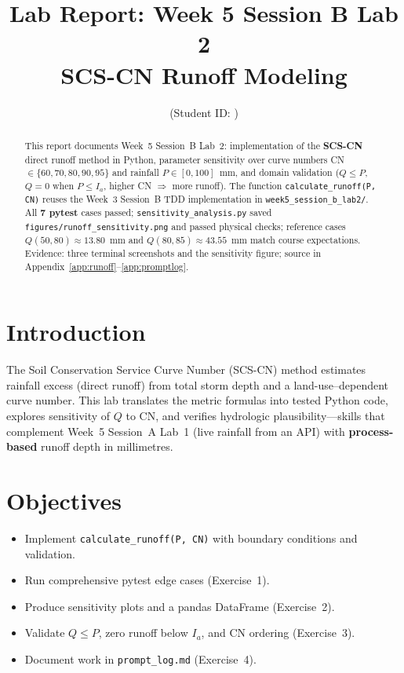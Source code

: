 \documentclass[11pt,a4paper]{article}
\title{Lab Report: Week 5 Session B Lab 2\\SCS-CN Runoff Modeling}
\author{\studentname \quad (Student ID: \studentid)}
\date{\reportdate}
\begin{document}
\maketitle

\begin{abstract}
This report documents Week~5 Session~B Lab~2: implementation of the \textbf{SCS-CN} direct runoff method in Python, parameter sensitivity over curve numbers CN$\in\{60,70,80,90,95\}$ and rainfall $P\in[0,100]$~mm, and domain validation ($Q\le P$, $Q=0$ when $P\le I_a$, higher CN $\Rightarrow$ more runoff). The function \texttt{calculate\_runoff(P, CN)} reuses the Week~3 Session~B TDD implementation in \texttt{week5\_session\_b\_lab2/}. All \textbf{7 pytest} cases passed; \texttt{sensitivity\_analysis.py} saved \texttt{figures/runoff\_sensitivity.png} and passed physical checks; reference cases $Q(50,80)\approx 13.80$~mm and $Q(80,85)\approx 43.55$~mm match course expectations. Evidence: three terminal screenshots and the sensitivity figure; source in Appendix~\ref{app:runoff}--\ref{app:promptlog}.
\end{abstract}

\section{Introduction}
The Soil Conservation Service Curve Number (SCS-CN) method estimates rainfall excess (direct runoff) from total storm depth and a land-use--dependent curve number. This lab translates the metric formulas into tested Python code, explores sensitivity of $Q$ to CN, and verifies hydrologic plausibility---skills that complement Week~5 Session~A Lab~1 (live rainfall from an API) with \textbf{process-based} runoff depth in millimetres.

\section{Objectives}
\begin{itemize}[noitemsep]
  \item Implement \texttt{calculate\_runoff(P, CN)} with boundary conditions and validation.
  \item Run comprehensive pytest edge cases (Exercise~1).
  \item Produce sensitivity plots and a pandas DataFrame (Exercise~2).
  \item Validate $Q\le P$, zero runoff below $I_a$, and CN ordering (Exercise~3).
  \item Document work in \texttt{prompt\_log.md} (Exercise~4).
\end{itemize}
\end{document}
